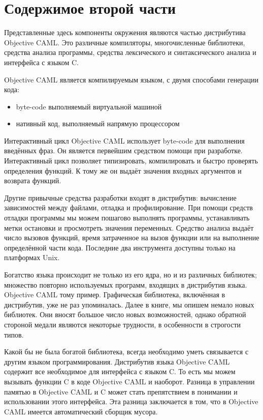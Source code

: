 \section*{Содержимое второй части}

Представленные здесь компоненты окружения являются частью дистрибутива Objective
CAML. Это различные компиляторы, многочисленные библиотеки, средства анализа
программы, средства лексического и синтаксического анализа и интерфейса с языком
C.

Objective CAML является компилируемым языком, с двумя способами генерации кода:

\begin{itemize}
	\item byte-code выполняемый виртуальной машиной

	\item нативный код, выполняемый напрямую процессором
\end{itemize}

Интерактивный цикл Objective CAML использует byte-code для выполнения введённых
фраз. Он является первейшим средством помощи при разработке. Интерактивный цикл
позволяет типизировать, компилировать и быстро проверять определения функций. К
тому же он выдаёт значения входных аргументов и возврата функций.

Другие привычные средства разработки входят в дистрибутив: вычисление
зависимостей между файлами, отладка и профилирование. При помощи
средств отладки программы мы можем пошагово выполнять программы, устанавливать
метки остановки и просмотреть значения переменных. Средство анализа выдаёт число
вызовов функций, время затраченное на вызов функции или на выполнение
определённой части кода. Последние два инструмента доступны только на платформах
Unix.

Богатство языка происходит не только из его ядра, но и из различных
библиотек; множество повторно используемых программ, входящих в дистрибутив
языка. Objective CAML тому пример. Графическая библиотека, включённая в
дистрибутив, уже не раз упоминалась. Далее в книге, мы опишем немало новых
библиотек. Они вносят большое число новых возможностей, однако обратной стороной
медали являются некоторые трудности, в особенности в строгости типов.

Какой бы не была богатой библиотека, всегда необходимо уметь связывается с
другим языком программирования. Дистрибутив языка Objective CAML содержит все
необходимое для интерфейса с языком C. То есть мы можем вызывать функции C в
коде Objective CAML и наоборот. Разница в управлении памятью в Objective CAML и
C может стать препятствием в понимании и использовании этого интерфейса. Эта
разница заключается в том, что в Objective CAML имеется автоматический сборщик
мусора.

